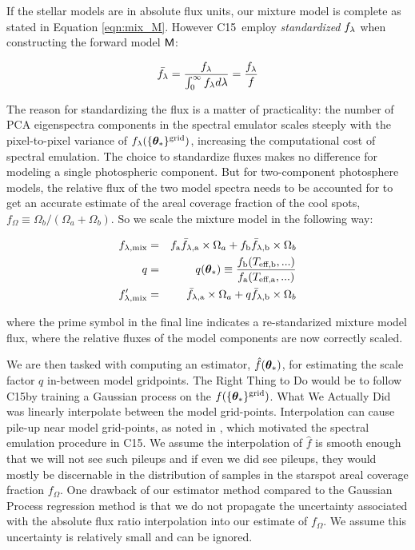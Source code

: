 \documentclass[twocolumn]{emulateapj}%
\newcommand{\iancze}{{\sc C15}}
\begin{document}
If the stellar models are in absolute flux units, our mixture model is complete as stated in Equation \ref{eqn:mix_M}.  However \iancze\ employ \emph{standardized} $f_\lambda$ when constructing the forward model $\mathsf{M}$:


\begin{eqnarray} \label{eqn:normalization}
\bar {f_\lambda} = \frac{f_\lambda}{\int_{0}^{\infty} f_\lambda d\lambda} = \frac{f_\lambda}{f}
\end{eqnarray}

The reason for standardizing the flux is a matter of practicality: the number of PCA eigenspectra components in the spectral emulator scales steeply with the pixel-to-pixel variance of $f_{\lambda}(\{{\bm \theta}_{\ast}\}^\textrm{grid})$, increasing the computational cost of spectral emulation.  The choice to standardize fluxes makes no difference for modeling a single photospheric component.  But for two-component photosphere models, the relative flux of the two model spectra needs to be accounted for to get an accurate estimate of the areal coverage fraction of the cool spots, $f_{\Omega} \equiv \Omega_b/(\Omega_a+\Omega_b)$.  So we scale the mixture model in the following way:

\begin{eqnarray} \label{eqn:norm_scaling}
f_{\lambda, \mathrm{mix}} &=& f_{\mathrm{a}} \bar f_{\lambda, \mathrm{a}} \times \Omega_a + f_{\mathrm{b}} \bar f_{\lambda, \mathrm{b}} \times \Omega_b \\
q &=& q({\bm \theta}_{\ast})\equiv \frac{f_{\mathrm{b}}(T_\textrm{eff,b}, ...)}{f_{\mathrm{a}}(T_\textrm{eff,a}, ...)} \\
f_{\lambda, \mathrm{mix}}^{\prime} &=& \bar f_{\lambda, \mathrm{a}} \times \Omega_a + q \bar f_{\lambda, \mathrm{b}} \times \Omega_b
\end{eqnarray}

where the prime symbol in the final line indicates a re-standarized mixture model flux, where the relative fluxes of the model components are now correctly scaled.

We are then tasked with computing an estimator, $\hat f({\bm \theta}_{\ast})$, for estimating the scale factor $q$ in-between model gridpoints.  The Right Thing to Do would be to follow \iancze by training a Gaussian process on the $f(\{{\bm \theta}_{\ast}\}^\textrm{grid})$.  What We Actually Did was linearly interpolate between the model grid-points.  Interpolation can cause pile-up near model grid-points, as noted in \citet{cottaar14}, which motivated the spectral emulation procedure in \iancze.  We assume the interpolation of $\hat f$ is smooth enough that we will not see such pileups and if even we did see pileups, they would mostly be discernable in the distribution of samples in the starspot areal coverage fraction $f_{\Omega}$.  One drawback of our estimator method compared to the Gaussian Process regression method is that we do not propagate the uncertainty associated with the absolute flux ratio interpolation into our estimate of $f_{\Omega}$.  We assume this uncertainty is relatively small and can be ignored.
\end{document}
